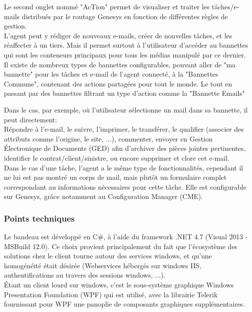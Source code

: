 \documentclass{rapport}
\begin{document}
Le second onglet nommé "AcTion" permet de visualiser et traiter les tâches/e-mails distribués par le routage Genesys en fonction de différentes règles de gestion.\\

L'agent peut y rédiger de nouveaux e-mails, créer de nouvelles tâches, et les réaffecter à un tiers. Mais il permet surtout à l'utilisateur d'accéder au bannettes qui sont les conteneurs principaux pour tous les médias manipulé par ce dernier. \\
Il existe de nombreux types de bannettes configurables, pouvant aller de "ma bannette" pour les tâches et e-mail de l'agent connecté, à la "Bannettes Commune", contenant des actions partagées pour tout le monde. Le tout en passant par des bannettes filtrant un type d'action comme la "Bannette Emails"\\



Dans le cas, par exemple, où l'utilisateur sélectionne un mail dans sa bannette, il peut directement:\\
Répondre à l'e-mail, le suivre, l'imprimer, le transférer, le qualifier (associer des attributs comme l'origine, le site, ...), commenter, envoyer en Gestion Électronique de Documents (GED) afin d'archiver des pièces jointes pertinentes, identifier le contrat/client/sinistre, ou encore supprimer et clore cet e-mail.\\

Dans le cas d'une tâche, l'agent a le même type de fonctionnalités, cependant il ne lui est pas montré un corps de mail, mais plutôt un formulaire complet correspondant au informations nécessaires pour cette tâche. Elle est configurable sur Genesys, grâce notamment au Configuration Manager (CME).

\subsubsection{Points techniques}

Le bandeau est développé en C\#, à l'aide du framework .NET 4.7 (Visual 2013 - MSBuild 12.0). Ce choix provient principalement du fait que l'écosystème des solutions chez le client tourne autour des services windows, et qu'une homogénéité était désirée (Webservices hébergés sur windows IIS, authentifications au travers des sessions windows, ...).\\
Étant un client lourd sur windows, c'est le sous-système graphique Windows Presentation Foundation (WPF) qui est utilisé, avec la librairie Telerik fournissant pour WPF une panoplie de composants graphiques supplémentaires.\\
\end{document}
